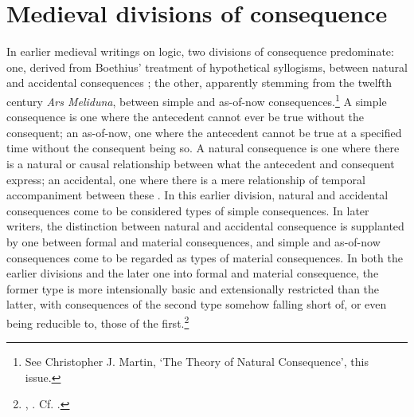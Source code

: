 \documentclass[]{article}
\begin{document}
\section{Medieval divisions of consequence}
In earlier medieval writings on logic, two divisions of consequence predominate: one, derived from Boethius' treatment of hypothetical syllogisms, between natural and accidental consequences \autocite[I, c. 3, par. 6, p. 219]{BHS}; the other, apparently stemming from the twelfth century \textit{Ars Meliduna}, between simple and as-of-now consequences.\footnote{See Christopher J. Martin, `The Theory of Natural Consequence', this issue.} A simple consequence is one where the antecedent cannot ever be true without the consequent; an as-of-now, one where the antecedent cannot be true at a specified time without the consequent being so. A natural consequence is one where there is a natural or causal relationship between what the antecedent and consequent express; an accidental, one where there is a mere relationship of temporal accompaniment between these \autocite[pp. 60.28-61.25]{BurleyDPAL}. In this earlier division, natural and accidental consequences come to be considered types of simple consequences. In later writers, the distinction between natural and accidental consequence is supplanted by one between formal and material consequences, and simple and as-of-now consequences come to be regarded as types of material consequences. In both the earlier divisions and the later one into formal and material consequence, the former type is more intensionally basic and extensionally restricted than the latter, with consequences of the second type somehow falling short of, or even being reducible to, those of the first.\footnote{\autocite[152]{SherwoodNewSyncategoremata}, \autocite[I, q. 10, p. 105]{Pseudo-Scotus1891}. Cf. \autocite[VIII, par. 117, p. 142]{Green-Pedersen1980b}.}


\end{document}
